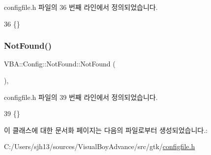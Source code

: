 configfile.\+h 파일의 36 번째 라인에서 정의되었습니다.


\begin{DoxyCode}
36 \{\}
\end{DoxyCode}
\mbox{\label{class_v_b_a_1_1_config_1_1_not_found_af726fdbaac59859049e6fb028c3f6d14}} 
\subsubsection{\texorpdfstring{Not\+Found()}{NotFound()}}
{\footnotesize\ttfamily V\+B\+A\+::\+Config\+::\+Not\+Found\+::\+Not\+Found (\begin{DoxyParamCaption}{ }\end{DoxyParamCaption})\hspace{0.3cm}{\ttfamily [inline]}, {\ttfamily [protected]}}



configfile.\+h 파일의 39 번째 라인에서 정의되었습니다.


\begin{DoxyCode}
39 \{\}
\end{DoxyCode}


이 클래스에 대한 문서화 페이지는 다음의 파일로부터 생성되었습니다.\+:\begin{DoxyCompactItemize}
\item 
C\+:/\+Users/sjh13/sources/\+Visual\+Boy\+Advance/src/gtk/\mbox{\hyperlink{configfile_8h}{configfile.\+h}}\end{DoxyCompactItemize}
